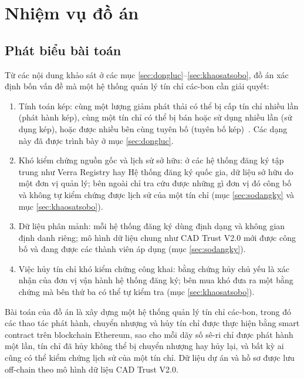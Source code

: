 \section{Nhiệm vụ đồ án}
\label{sec:nhiemvu}

\subsection*{Phát biểu bài toán}
\label{subsec:baitoan}
Từ các nội dung khảo sát ở các mục \ref{sec:dongluc}--\ref{sec:khaosatsobo}, đồ án xác định bốn vấn đề mà một hệ thống quản lý tín chỉ các-bon cần giải quyết:
\begin{enumerate}
    \item Tính toán kép: cùng một lượng giảm phát thải có thể bị cấp tín chỉ nhiều lần (phát hành kép), cùng một tín chỉ có thể bị bán hoặc sử dụng nhiều lần (sử dụng kép), hoặc được nhiều bên cùng tuyên bố (tuyên bố kép)~\cite{schneider2019double}. Các dạng này đã được trình bày ở mục \ref{sec:dongluc}.
    \item Khó kiểm chứng nguồn gốc và lịch sử sở hữu: ở các hệ thống đăng ký tập trung như Verra Registry hay Hệ thống đăng ký quốc gia, dữ liệu sở hữu do một đơn vị quản lý; bên ngoài chỉ tra cứu được những gì đơn vị đó công bố và không tự kiểm chứng được lịch sử của một tín chỉ (mục \ref{sec:sodangky} và mục \ref{sec:khaosatsobo}).
    \item Dữ liệu phân mảnh: mỗi hệ thống đăng ký dùng định dạng và không gian định danh riêng; mô hình dữ liệu chung như CAD Trust V2.0 mới được công bố và đang được các thành viên áp dụng (mục \ref{sec:sodangky}).
    \item Việc hủy tín chỉ khó kiểm chứng công khai: bằng chứng hủy chủ yếu là xác nhận của đơn vị vận hành hệ thống đăng ký; bên mua khó đưa ra một bằng chứng mà bên thứ ba có thể tự kiểm tra (mục \ref{sec:khaosatsobo}).
\end{enumerate}
Bài toán của đồ án là xây dựng một hệ thống quản lý tín chỉ các-bon, trong đó các thao tác phát hành, chuyển nhượng và hủy tín chỉ được thực hiện bằng smart contract trên blockchain Ethereum, sao cho mỗi dãy số sê-ri chỉ được phát hành một lần, tín chỉ đã hủy không thể bị chuyển nhượng hay hủy lại, và bất kỳ ai cũng có thể kiểm chứng lịch sử của một tín chỉ. Dữ liệu dự án và hồ sơ được lưu off-chain theo mô hình dữ liệu CAD Trust V2.0.

